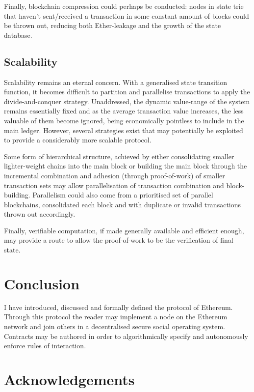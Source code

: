 \documentclass[9pt,oneside]{amsart}
\begin{document}
\begin{multicols}{2}
Finally, blockchain compression could perhaps be conducted: nodes in state trie that haven't sent/received a transaction in some constant amount of blocks could be thrown out, reducing both Ether-leakage and the growth of the state database.

\subsection{Scalability}

Scalability remains an eternal concern. With a generalised state transition function, it becomes difficult to partition and parallelise transactions to apply the divide-and-conquer strategy. Unaddressed, the dynamic value-range of the system remains essentially fixed and as the average transaction value increases, the less valuable of them become ignored, being economically pointless to include in the main ledger. However, several strategies exist that may potentially be exploited to provide a considerably more scalable protocol.

Some form of hierarchical structure, achieved by either consolidating smaller lighter-weight chains into the main block or building the main block through the incremental combination and adhesion (through proof-of-work) of smaller transaction sets may allow parallelisation of transaction combination and block-building. Parallelism could also come from a prioritised set of parallel blockchains, consolidated each block and with duplicate or invalid transactions thrown out accordingly.

Finally, verifiable computation, if made generally available and efficient enough, may provide a route to allow the proof-of-work to be the verification of final state.

\section{Conclusion} \label{ch:conclusion}

I have introduced, discussed and formally defined the protocol of Ethereum. Through this protocol the reader may implement a node on the Ethereum network and join others in a decentralised secure social operating system. Contracts may be authored in order to algorithmically specify and autonomously enforce rules of interaction.

\section{Acknowledgements}


\end{multicols}
\end{document}
